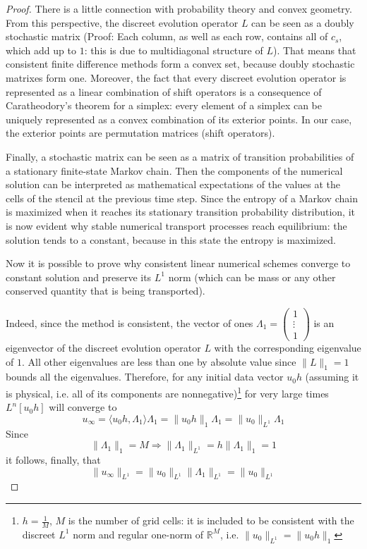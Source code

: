 \documentclass[a4paper]{amsproc}
\theoremstyle{plain}
\theoremstyle{definition}
\theoremstyle{remark}
\numberwithin{equation}{section}
\providecommand{\norm}[1]{\lVert#1 \rVert}
\begin{document}
\begin{proof}
There is a little connection with probability theory and convex geometry. From this perspective, the discreet evolution operator $L$ can be seen as a doubly stochastic matrix (Proof: Each column, as well as each row, contains all of $c_s$, which add up to $1$: this is due to multidiagonal structure of $L$). That means that consistent finite difference methods form a convex set, because doubly stochastic matrixes form one. Moreover, the fact that every discreet evolution operator is represented as a linear combination of shift operators is a consequence of Caratheodory's theorem for a simplex: every element of a simplex can be uniquely represented as a convex combination of its exterior points. In our case, the exterior points are permutation matrices (shift operators). 

Finally, a stochastic matrix can be seen as a matrix of transition probabilities of a stationary finite-state Markov chain. Then the components of the numerical solution can be interpreted as mathematical expectations of the values at the cells of the stencil at the previous time step. Since the entropy of a Markov chain is maximized when it reaches its stationary transition probability distribution, it is now evident why stable numerical transport processes reach equilibrium: the solution tends to a constant, because in this state the entropy is maximized.  

Now it is possible to prove why consistent linear numerical schemes converge to constant solution and preserve its $L^1$ norm (which can be mass or any other conserved quantity that is being transported). 

Indeed, since the method is consistent, the vector of ones $\Lambda_1 = \begin{pmatrix} 1 \\ \vdots \\ 1 \end{pmatrix}$ is an eigenvector of the discreet evolution operator $L$ with the corresponding eigenvalue of $1$. All other eigenvalues are less than one by absolute value since $\norm{L}_1 = 1$ bounds all the eigenvalues. Therefore, for any initial data vector $u_{0}h$ (assuming it is physical, i.e. all of its components are nonnegative)\footnote{$h = \frac{1}{M}$, $M$ is the number of grid cells: it is included to be consistent with the discreet $L^1$ norm and regular one-norm of $\mathbb{R}^M$, i.e. $\norm{u_0}_{L^1} = \norm{u_{0}h}_1 $}
for very large times $L^n[{u_0}h]$ will converge to 
$$u_\infty = \langle u_{0}h, \Lambda_1 \rangle \Lambda_1 = \norm{u_{0}h}_1 \Lambda_1 = \norm{u_{0}}_{L^1} \Lambda_1$$
Since 
$$\norm{\Lambda_1}_1 = M \Longrightarrow \norm{\Lambda_1}_{L^1} = h\norm{\Lambda_1}_1 = 1$$
it follows, finally, that $$\norm{u_\infty}_{L^1} = \norm{u_{0}}_{L^1} \norm{\Lambda_1}_{L^1} = \norm{u_{0}}_{L^1} $$  

\end{proof}
\end{document}
